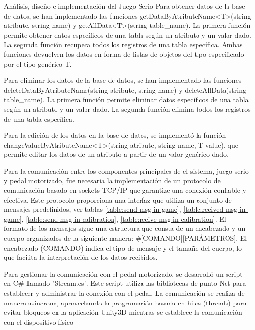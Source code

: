 \begin{thesischapter}{2} {Análisis, diseño e implementación del Juego Serio}
    Para obtener datos de la base de datos, se han implementado las funciones getDataByAtributeName<T>(string atribute, string name) y getAllData<T>(string table\_name). 
    La primera función permite obtener datos específicos de una tabla según un atributo y un valor dado. La segunda función recupera todos los registros de una tabla específica. 
    Ambas funciones devuelven los datos en forma de listas de objetos del tipo especificado por el tipo genérico T.

    Para eliminar los datos de la base de datos, se han implementado las funciones deleteDataByAtributeName(string atribute, string name) y deleteAllData(string table\_name). 
    La primera función permite eliminar datos específicos de una tabla según un atributo y un valor dado. La segunda función elimina todos los registros de una tabla específica. 

    Para la edición de los datos en la base de datos, se implementó la función changeValueByAtributeName<T>(string atribute, string name, T value), que 
    permite editar los datos de un atributo a partir de un valor genérico dado.

    Para la comunicación entre los componentes principales de el sistema, juego serio y pedal motorizado,
    fue necesaria la implementación de un protocolo de comunicación basado en sockets TCP/IP
    que garantize una conexión confiable y efectiva. Este protocolo proporciona una interfaz que utiliza un conjunto 
    de mensajes predefinidos, ver tablas 
    \ref{table:send-msg-in-game}, 
    \ref{table:recived-msg-in-game}, 
    \ref{table:send-msg-in-calibration}, 
    \ref{table:recive-msg-in-calibration}. El formato de los mensajes sigue una estructura  
    que consta de un encabezado y un cuerpo organizados de la siguiente manera: \#[COMANDO][PARÁMETROS]. El 
    encabezado (COMANDO) indica el tipo de mensaje y el tamaño del cuerpo, lo que facilita la interpretación de los datos recibidos.

    \vspace{10pt} 
    Para gestionar la comunicación con el pedal motorizado, se desarrolló un script en C\# llamado "Stream.cs". Este script 
    utiliza las bibliotecas de punto Net para establecer y administrar la conexión con el pedal. 
    La comunicación se realiza de manera asíncrona, aprovechando la programación basada en hilos (threads) para evitar bloqueos 
    en la aplicación Unity3D mientras se establece la comunicación con el dispositivo físico
    

\end{thesischapter}
